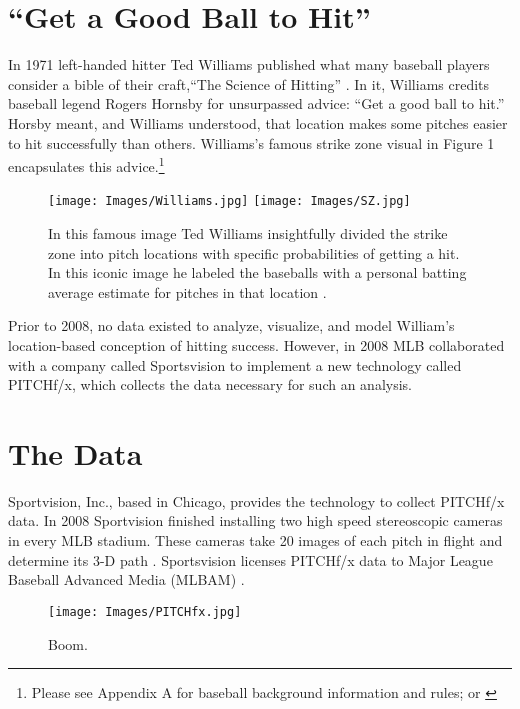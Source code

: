 \section{``Get a Good Ball to Hit''}
In 1971 left-handed hitter Ted Williams published what many baseball players consider a bible of their craft,``The Science of Hitting'' \citep{Williams1971}. In it, Williams credits baseball legend Rogers Hornsby for unsurpassed advice: ``Get a good ball to hit.'' Horsby meant, and Williams understood, that location makes some pitches easier to hit successfully than others. Williams's famous strike zone visual in Figure 1 encapsulates this advice.\footnote{Please see Appendix A for baseball background information and rules; or \citep{Wiki}}
        \begin{figure}[H]
      	\centering
      	\texttt{[image: Images/Williams.jpg]} 
      	\texttt{[image: Images/SZ.jpg]}
      	\caption{In this famous image Ted Williams insightfully divided the strike zone into pitch locations with specific probabilities of getting a hit. In this iconic image he labeled the baseballs with a personal batting average estimate for pitches in that location \citep{Williams1971}.}
      	\end{figure} 
Prior to 2008, no data existed to analyze, visualize, and model William's location-based conception of hitting success. However, in 2008 MLB collaborated with a company called Sportsvision to implement a new technology called PITCHf/x\textsuperscript{\textregistered}, which collects the  data necessary for such an analysis.

\section{The Data} %
Sportvision, Inc., based in Chicago, provides the technology to collect PITCHf/x\textsuperscript{\textregistered} data. In 2008 Sportvision finished installing two high speed stereoscopic cameras in every MLB\textsuperscript{\textregistered} stadium. These cameras take 20 images of each pitch in flight and determine its 3-D path \citep{Fast2010}. Sportsvision licenses PITCHf/x\textsuperscript{\textregistered} data to Major League Baseball Advanced Media (MLBAM\textsuperscript{\textregistered}) \citep{Baumer2010}. 

        \begin{figure}[H]
      	\centering
      	\texttt{[image: Images/PITCHfx.jpg]} 
      	\caption{Boom.}
      	\end{figure} 

